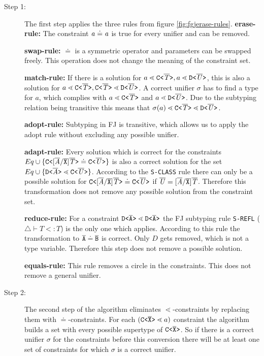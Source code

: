 \begin{description}
\item[Step 1:]
The first step applies the three rules from figure \ref{fig:fgjerase-rules}.
\textbf{erase-rule:} The constraint $\mathit{ a } \doteq \mathit{ a }$ is true for every unifier and can be removed.

\textbf{swap-rule:} $\doteq$ is a symmetric operator and parameters can be swapped freely.
This operation does not change the meaning of the constraint set.

\textbf{match-rule:}
If there is a solution for $a \lessdot \mathtt{C \texttt{<} \overline{\tt \mathit{T}} \texttt{>} }, a \lessdot \mathtt{D \texttt{<} \overline{\tt \mathit{U}} \texttt{>} }$,
this is also a solution for $a \lessdot \mathtt{C \texttt{<} \overline{\tt \mathit{T}} \texttt{>} }, \mathtt{C \texttt{<} \overline{\tt \mathit{T}} \texttt{>} } \lessdot \mathtt{D \texttt{<} \overline{\tt \mathit{U}} \texttt{>} }$.
A correct unifier $\sigma$ has to find a type for $a$, which complies with $a \lessdot \mathtt{C \texttt{<} \overline{\tt \mathit{T}} \texttt{>} }$ and $a \lessdot \mathtt{D \texttt{<} \overline{\tt \mathit{U}} \texttt{>} }$.
Due to the subtyping relation being transitive this means that $\sigma(a) \lessdot \mathtt{C \texttt{<} \overline{\tt \mathit{T}} \texttt{>} } \lessdot \mathtt{D \texttt{<} \overline{\tt \mathit{U}} \texttt{>} }$.

\textbf{adopt-rule:} Subtyping in FJ is transitive,
which allows us to apply the adopt rule without excluding any possible unifier.

\textbf{adapt-rule:} Every solution which is correct for the constraints
$Eq \cup \{  \mathtt{C \texttt{<} [\overline{\tt \mathit{A}}/\overline{\tt X}]\overline{\tt \mathit{T}} \texttt{>} } \doteq \mathtt{C \texttt{<} \overline{\tt \mathit{U}} \texttt{>} } \}$ is also
a correct solution for the set $Eq \cup \{  \mathtt{D \texttt{<} \overline{\tt \mathit{A}} \texttt{>} } \lessdot \mathtt{C \texttt{<} \overline{\tt \mathit{U}} \texttt{>} } \}$.
According to the \texttt{S-CLASS} rule there can only be a possible solution for 
$\mathtt{C \texttt{<} [\overline{\tt \mathit{A}}/\overline{\tt X}]\overline{\tt \mathit{T}} \texttt{>} } \doteq \mathtt{C \texttt{<} \overline{\tt \mathit{U}} \texttt{>} }$
if $\overline{\tt \mathit{U}} = [\overline{\tt \mathit{A}}/\overline{\tt X}]\overline{\tt \mathit{T}}$.
Therefore this transformation does not remove any possible solution from the constraint set.

\textbf{reduce-rule:}
For a constraint $\mathtt{D \texttt{<} \overline{\tt A} \texttt{>} } \lessdot \mathtt{D \texttt{<} \overline{\tt A} \texttt{>} }$ the FJ subtyping rule \texttt{S-REFL} ($\triangle \vdash T <: T$) is the only one which applies.
According to this rule the transformation to $\overline{\tt A} \doteq \overline{\tt B}$ is correct.
Only $D$ gets removed, which is not a type variable.
Therefore this step does not remove a possible solution.

\textbf{equals-rule:}
This rule removes a circle in the constraints.
This does not remove a general unifier.

\item[Step 2:]
The second step of the algorithm eliminates $\lessdot$-constraints
by replacing them with $\doteq$-constraints.
For each $(\mathtt{C \texttt{<} \overline{\tt X} \texttt{>} } \lessdot a)$ constraint the algorithm builds a set with every
possible supertype of $\mathtt{C \texttt{<} \overline{\tt X} \texttt{>} }$.
So if there is a correct unifier $\sigma$ for the constraints before this conversion there will be at least one set of
constraints for which $\sigma$ is a correct unifier.


\end{description}
